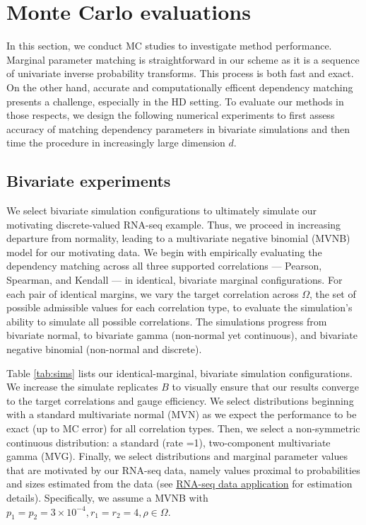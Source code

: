 \documentclass[
]{jss}
\begin{document}
\clearpage

\hypertarget{simulations}{%
\section{Monte Carlo evaluations}\label{simulations}}

In this section, we conduct MC studies to investigate method performance. Marginal parameter matching is straightforward in our scheme as it is a sequence of univariate inverse probability transforms. This process is both fast and exact. On the other hand, accurate and computationally efficent dependency matching presents a challenge, especially in the HD setting. To evaluate our methods in those respects, we design the following numerical experiments to first assess accuracy of matching dependency parameters in bivariate simulations and then time the procedure in increasingly large dimension \(d\).

\hypertarget{bivariate-experiments}{%
\subsection{Bivariate experiments}\label{bivariate-experiments}}

We select bivariate simulation configurations to ultimately simulate our motivating discrete-valued RNA-seq example. Thus, we proceed in increasing departure from normality, leading to a multivariate negative binomial (MVNB) model for our motivating data. We begin with empirically evaluating the dependency matching across all three supported correlations --- Pearson, Spearman, and Kendall --- in identical, bivariate marginal configurations. For each pair of identical margins, we vary the target correlation across \(\Omega\), the set of possible admissible values for each correlation type, to evaluate the simulation's ability to simulate all possible correlations. The simulations progress from bivariate normal, to bivariate gamma (non-normal yet continuous), and bivariate negative binomial (non-normal and discrete).

Table \ref{tab:sims} lists our identical-marginal, bivariate simulation configurations. We increase the simulate replicates \(B\) to visually ensure that our results converge to the target correlations and gauge efficiency. We select distributions beginning with a standard multivariate normal (MVN) as we expect the performance to be exact (up to MC error) for all correlation types. Then, we select a non-symmetric continuous distribution: a standard (rate =1), two-component multivariate gamma (MVG). Finally, we select distributions and marginal parameter values that are motivated by our RNA-seq data, namely values proximal to probabilities and sizes estimated from the data (see \href{examples}{RNA-seq data application} for estimation details). Specifically, we assume a MVNB with \(p_1 = p_2 = 3\times10^{-4}, r_1 = r_2 = 4, \rho \in \Omega\).
\end{document}
